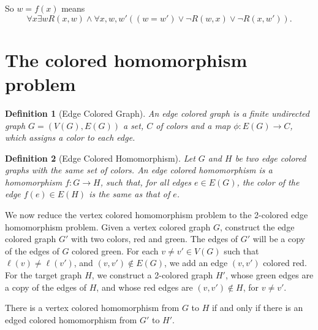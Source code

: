 \documentclass{article}
\newtheorem{definition}{Definition}
\begin{document}
So $w=f(x)$ means
\begin{displaymath}
  \forall x \exists w R(x,w) \wedge \forall x,w,w' ((w = w') \vee
  \neg R(w,x) \vee \neg R(x,w')).
\end{displaymath}

\section{The colored homomorphism problem}
\label{sec:colored}

\begin{definition}[Edge Colored Graph]
  An \emph{edge colored graph} is a finite undirected graph $G =
  (V(G), E(G))$ a set, $C$ of colors and a map $\phi: E(G) \rightarrow
  C$, which assigns a color to each edge.
\end{definition}
\begin{definition}[Edge Colored Homomorphism]
Let $G$ and $H$ be two edge colored graphs with the same set of
colors.  An \emph{edge colored homomorphism} is a homomorphism $f : G
\rightarrow H$, such that, for all edges $e \in E(G)$, the color of
the edge $f(e) \in E(H)$ is the same as that of $e$.
\end{definition}

We now reduce the vertex colored homomorphism problem to the 2-colored
edge homomorphism problem.  Given a vertex colored graph $G$,
construct the edge colored graph $G'$ with two colors, red and green.
The edges of $G'$ will be a copy of the edges of $G$ colored green.
For each $v \ne v' \in V(G)$ such that $\ell(v) \ne \ell(v')$, and
$(v,v') \not \in E(G)$, we add an edge $(v,v')$ colored red.  For the
target graph $H$, we construct a 2-colored graph $H'$, whose green
edges are a copy of the edges of $H$, and whose red edges are
$(v,v') \not \in H$, for $v \ne v'$.
\begin{proposition}
  There is a vertex colored homomorphism from $G$ to $H$ if and only
  if there is an edged colored homomorphism from $G'$ to $H'$.
\end{proposition}
\end{document}
